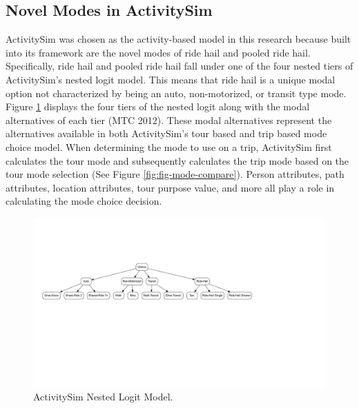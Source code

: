 \documentclass[12pt, oneside, openright]{byuthesis}
\begin{document}
\hypertarget{novel-modes-in-activitysim}{%
\subsection{Novel Modes in ActivitySim}\label{novel-modes-in-activitysim}}

ActivitySim was chosen as the activity-based model in this research because built into its framework are the novel modes of ride hail and pooled ride hail. Specifically, ride hail and pooled ride hail fall under one of the four nested tiers of ActivitySim's nested logit model. This means that ride hail is a unique modal option not characterized by being an auto, non-motorized, or transit type mode. Figure \ref{fig:fig-asim-nest} displays the four tiers of the nested logit along with the modal alternatives of each tier (MTC 2012). These modal alternatives represent the alternatives available in both ActivitySim's tour based and trip based mode choice model. When determining the mode to use on a trip, ActivitySim first calculates the tour mode and subsequently calculates the trip mode based on the tour mode selection (See Figure \ref{fig:fig-mode-compare}). Person attributes, path attributes, location attributes, tour purpose value, and more all play a role in calculating the mode choice decision.

\begin{figure}

{\centering \includegraphics[width=.7\textwidth,trim = {5cm 6.5cm 12.5cm 4cm}]{thesis_files/figure-latex/fig-asim-nest-1} 

}

\caption{ActivitySim Nested Logit Model.}\label{fig:fig-asim-nest}
\end{figure}
\end{document}
